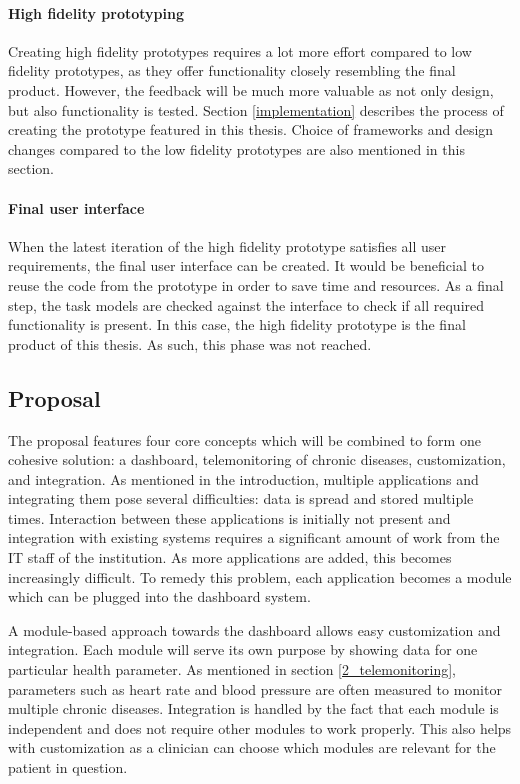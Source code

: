         \paragraph{High fidelity prototyping} Creating high fidelity prototypes requires a lot more effort compared to low fidelity prototypes, as they offer functionality closely resembling the final product. However, the feedback will be much more valuable as not only design, but also functionality is tested. Section \ref{implementation} describes the process of creating the prototype featured in this thesis. Choice of frameworks and design changes compared to the low fidelity prototypes are also mentioned in this section.

        \paragraph{Final user interface} When the latest iteration of the high fidelity prototype satisfies all user requirements, the final user interface can be created. It would be beneficial to reuse the code from the prototype in order to save time and resources. As a final step, the task models are checked against the interface to check if all required functionality is present. In this case, the high fidelity prototype is the final product of this thesis. As such, this phase was not reached.

    \subsection{Proposal}
    
    The proposal features four core concepts which will be combined to form one cohesive solution: a dashboard, telemonitoring of chronic diseases, customization, and integration. As mentioned in the introduction, multiple applications and integrating them pose several difficulties: data is spread and stored multiple times. Interaction between these applications is initially not present and integration with existing systems requires a significant amount of work from the IT staff of the institution. As more applications are added, this becomes increasingly difficult. To remedy this problem, each application becomes a module which can be plugged into the dashboard system.

    A module-based approach towards the dashboard allows easy customization and integration. Each module will serve its own purpose by showing data for one particular health parameter. As mentioned in section \ref{2_telemonitoring}, parameters such as heart rate and blood pressure are often measured to monitor multiple chronic diseases. Integration is handled by the fact that each module is independent and does not require other modules to work properly. This also helps with customization as a clinician can choose which modules are relevant for the patient in question.

